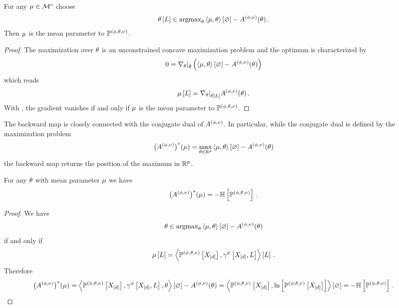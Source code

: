 \begin{theorem}
    For any $\mu\in{\mathcal{M}}^{\circ}$ choose
    \begin{align*}
        \theta\left[L\right] \in \mathrm{argmax}_{\theta} \left\langle \mu,\theta\right\rangle \left[ \varnothing \right] - A^{(\phi,\nu)}(\theta) \, .
    \end{align*}
    Then $\mu$ is the mean parameter to $\mathbb{P}^{(\phi,\theta,\nu)}$.
\end{theorem}
\begin{proof}
    The maximization over $\theta$ is an unconstrained concave maximization problem and the optimum is characterized by
    \begin{align*}
        0 = \nabla_{\theta}|_{\tilde{\theta}}\left(\left\langle \mu,\theta\right\rangle \left[ \varnothing \right] - A^{(\phi,\nu)}(\theta)\right)
    \end{align*}
    which reads
    \begin{align*}
        \mu\left[L\right] = \nabla_{\theta}|_{\tilde{\theta}[L]} A^{(\phi,\nu)}(\theta) \, .
    \end{align*}
    With , the gradient vanishes if and only if $\mu$ is the mean parameter to $\mathbb{P}^{(\phi,\theta,\nu)}$.
\end{proof}

The backward map is closely connected with the conjugate dual of $A^{(\phi,\nu)}$.
In particular, while the conjugate dual is defined by the maximization problem
\begin{align*}
    \big(A^{(\phi,\nu)}\big)^*(\mu) = \max_{\theta\in\mathbb{R}^{p}} \left\langle \mu,\theta\right\rangle \left[ \varnothing \right] - A^{(\phi,\nu)}(\theta)
\end{align*}
the backward map returns the position of the maximum in $\mathbb{R}^{p}$.

\begin{lemma}\label{lem:dualCumEntropy}
    For any $\theta$ with mean parameter $\mu$ we have
    \begin{align*}
        \big(A^{(\phi,\nu)}\big)^*(\mu) = - \mathbb{H}\left[\mathbb{P}^{(\phi,\theta,\nu)}\right] \, .
    \end{align*}
\end{lemma}
\begin{proof}
    We have
    \begin{align*}
        \theta \in \mathrm{argmax}_{\theta} \left\langle \mu,\theta\right\rangle \left[ \varnothing \right] - A^{(\phi,\nu)}(\theta)
    \end{align*}
    if and only if
    \begin{align*}
        \mu\left[L\right] = \left\langle \mathbb{P}^{(\phi,\theta,\nu)}\left[X_{[d]}\right],\gamma^{\phi}\left[X_{[d]},L\right]\right\rangle \left[ L \right] \, .
    \end{align*}
    Therefore
    \begin{align*}
        \big(A^{(\phi,\nu)}\big)^*(\mu) = \left\langle \mathbb{P}^{(\phi,\theta,\nu)}\left[X_{[d]}\right],\gamma^{\phi}\left[X_{[d]},L\right],\theta\right\rangle \left[ \varnothing \right] - A^{(\phi,\nu)}(\theta)
        = \left\langle \mathbb{P}^{(\phi,\theta,\nu)}\left[X_{[d]}\right], \ln \left[ \mathbb{P}^{(\phi,\theta,\nu)}\left[X_{[d]}\right] \right]\right\rangle \left[ \varnothing \right]
        = - \mathbb{H}\left[\mathbb{P}^{(\phi,\theta,\nu)}\right] \, .
    \end{align*}
\end{proof}


